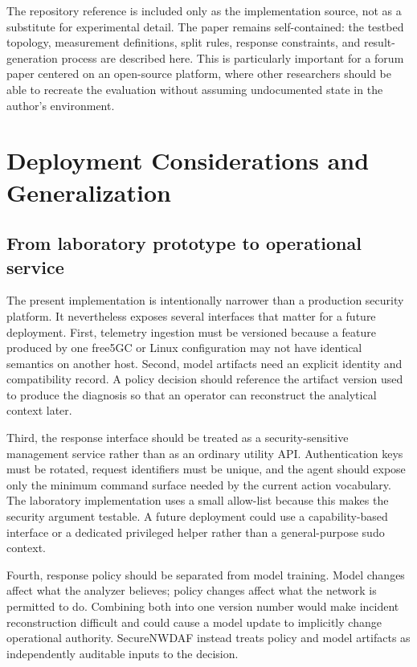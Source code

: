 \documentclass[sigconf,review]{acmart}
\begin{document}
The repository reference is included only as the implementation source, not as a substitute for experimental detail. The paper remains self-contained: the testbed topology, measurement definitions, split rules, response constraints, and result-generation process are described here. This is particularly important for a forum paper centered on an open-source platform, where other researchers should be able to recreate the evaluation without assuming undocumented state in the author's environment.

\section{Deployment Considerations and Generalization}
\subsection{From laboratory prototype to operational service}
The present implementation is intentionally narrower than a production security platform. It nevertheless exposes several interfaces that matter for a future deployment. First, telemetry ingestion must be versioned because a feature produced by one free5GC or Linux configuration may not have identical semantics on another host. Second, model artifacts need an explicit identity and compatibility record. A policy decision should reference the artifact version used to produce the diagnosis so that an operator can reconstruct the analytical context later.

Third, the response interface should be treated as a security-sensitive management service rather than as an ordinary utility API. Authentication keys must be rotated, request identifiers must be unique, and the agent should expose only the minimum command surface needed by the current action vocabulary. The laboratory implementation uses a small allow-list because this makes the security argument testable. A future deployment could use a capability-based interface or a dedicated privileged helper rather than a general-purpose sudo context.

Fourth, response policy should be separated from model training. Model changes affect what the analyzer believes; policy changes affect what the network is permitted to do. Combining both into one version number would make incident reconstruction difficult and could cause a model update to implicitly change operational authority. SecureNWDAF instead treats policy and model artifacts as independently auditable inputs to the decision.
\end{document}
